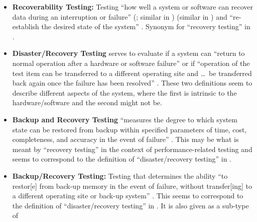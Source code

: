 \begin{itemize}
      \item \textbf{Recoverability Testing:} Testing ``how well a system or
            software can recover data during an interruption or failure''
            \ifnotpaper
                  (\citealp[p.~7-10]{SWEBOK2024}; similar in \citealp{ISO_IEC2023a})
            \else
                  \cite[p.~7-10]{SWEBOK2024} (similar in \cite{ISO_IEC2023a})
            \fi
            and ``re-establish the desired state of the system'' \citep{ISO_IEC2023a}.
            Synonym for ``recovery testing'' in \citet[p.~47]{Kam2008}.
      \item \textbf{Disaster/Recovery Testing} serves to evaluate if a system
            can ``return to normal operation after a hardware
            or software failure'' \citep[p.~140]{IEEE2017} or if ``operation of
            the test item can be transferred to a different operating site and
            \dots\ be transferred back again once the failure has been
            resolved'' \citeyearpar[p.~37]{IEEE2021}. These two definitions seem to
            describe different aspects of the system, where the first is
            intrinsic to the hardware/software and the second might not be.
      \item \textbf{Backup and Recovery Testing} ``measures the
            degree to which system state can be restored from backup within
            specified parameters of time, cost, completeness, and accuracy in
            the event of failure'' \citep[p.~2]{IEEE2013}. This may be what is
            meant by ``recovery testing'' in the context of performance-related
            testing and seems to correspond to the definition of
            ``disaster/recovery testing'' in \citeyearpar[p.~140]{IEEE2017}.
      \item \textbf{Backup/Recovery Testing:} Testing that determines the
            ability ``to restor[e] from back-up memory in the event of failure,
            without transfer[ing] to a different operating site or back-up
            system'' \citep[p.~37]{IEEE2021}. This seems to correspond to the
            definition of ``disaster/recovery testing'' in
            \citeyearpar[p.~37]{IEEE2021}. It is also given as a sub-type of

\end{itemize}

